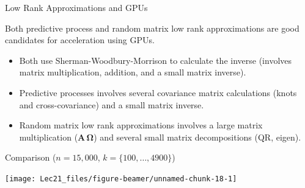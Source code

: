 \documentclass[11pt,ignorenonframetext,]{beamer}
\providecommand{\tightlist}{%
  \setlength{\itemsep}{0pt}\setlength{\parskip}{0pt}}
\begin{document}
\begin{frame}{Low Rank Approximations and GPUs}
\protect\hypertarget{low-rank-approximations-and-gpus}{}

Both predictive process and random matrix low rank approximations are
good candidates for acceleration using GPUs.

\vspace{3mm}

\begin{itemize}
\tightlist
\item
  Both use Sherman-Woodbury-Morrison to calculate the inverse (involves
  matrix multiplication, addition, and a small matrix inverse).
\end{itemize}

\vspace{3mm}

\begin{itemize}
\tightlist
\item
  Predictive processes involves several covariance matrix calculations
  (knots and cross-covariance) and a small matrix inverse.
\end{itemize}

\vspace{3mm}

\begin{itemize}
\tightlist
\item
  Random matrix low rank approximations involves a large matrix
  multiplication (\(\symbf{A}\,\symbf{\Omega}\)) and several small
  matrix decompositions (QR, eigen).
\end{itemize}

\end{frame}

\begin{frame}{Comparison (\(n=15,000\), \(k=\{100,\ldots,4900\}\))}
\protect\hypertarget{comparison-n15000-k100ldots4900}{}

\begin{center}\texttt{[image: Lec21\_files/figure-beamer/unnamed-chunk-18-1]} \end{center}

\end{frame}
\end{document}
